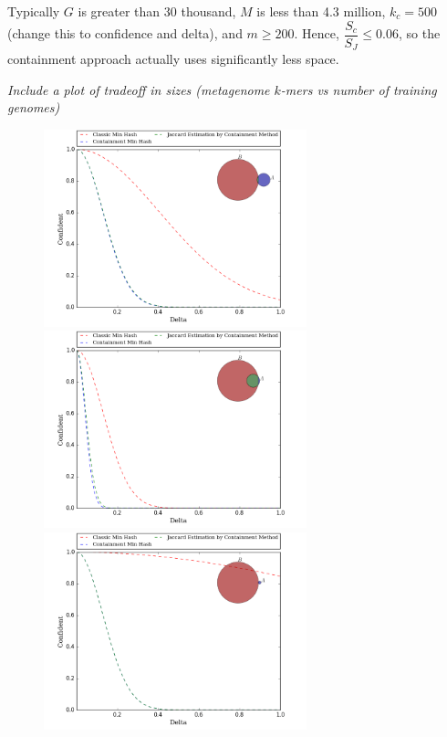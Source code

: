 \documentclass[11pt]{amsart}
\theoremstyle{remark}
\numberwithin{equation}{section}
\begin{document}
Typically $G$ is greater than 30 thousand, $M$ is less than 4.3 million, $k_c=500$ (change this to confidence and delta), and $m\geq 200$. Hence, $\dfrac{S_c}{S_J}\leq 0.06$, so the containment approach actually uses significantly less space.

\textit{Include a plot of tradeoff in sizes (metagenome $k$-mers vs number of training genomes)}

\begin{figure}[!h]%
\begin{center}
\includegraphics[width=3.0in,trim={0 0 0 0in},clip]{Figs/deltaConfident-1010.png}%
\hspace{1ex}
\includegraphics[width=3.0in,trim={0 0 0 0in},clip]{Figs/deltaConfident-1090.png}\\
\includegraphics[width=3.0in,trim={0 0 0 0in},clip]{Figs/deltaConfident-20010.png}%

\end{center}
\end{figure}
\end{document}
